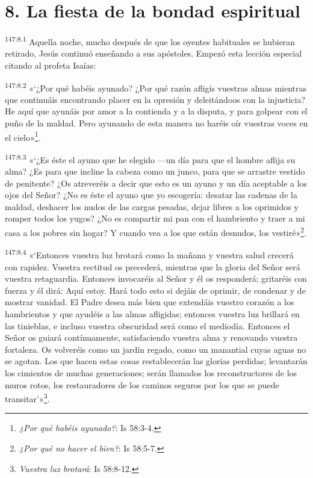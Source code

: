 \section*{8. La fiesta de la bondad espiritual}
\par
\textsuperscript{147:8.1} Aquella noche, mucho después de que los oyentes habituales se hubieran retirado, Jesús continuó enseñando a sus apóstoles. Empezó esta lección especial citando al profeta Isaías:

\par
\textsuperscript{147:8.2} «`¿Por qué habéis ayunado? ¿Por qué razón afligís vuestras almas mientras que continuáis encontrando placer en la opresión y deleitándoos con la injusticia? He aquí que ayunáis por amor a la contienda y a la disputa, y para golpear con el puño de la maldad. Pero ayunando de esta manera no haréis oír vuestras voces en el cielo»\footnote{\textit{¿Por qué habéis ayunado?}: Is 58:3-4.}.

\par
\textsuperscript{147:8.3} «`¿Es éste el ayuno que he elegido ---un día para que el hombre aflija su alma? ¿Es para que incline la cabeza como un junco, para que se arrastre vestido de penitente? ¿Os atreveréis a decir que esto es un ayuno y un día aceptable a los ojos del Señor? ¿No es éste el ayuno que yo escogería: desatar las cadenas de la maldad, deshacer los nudos de las cargas pesadas, dejar libres a los oprimidos y romper todos los yugos? ¿No es compartir mi pan con el hambriento y traer a mi casa a los pobres sin hogar? Y cuando vea a los que están desnudos, los vestiré»\footnote{\textit{¿Por qué no hacer el bien?}: Is 58:5-7.}.

\par
\textsuperscript{147:8.4} «`Entonces vuestra luz brotará como la mañana y vuestra salud crecerá con rapidez. Vuestra rectitud os precederá, mientras que la gloria del Señor será vuestra retaguardia. Entonces invocaréis al Señor y él os responderá; gritaréis con fuerza y él dirá: Aquí estoy. Hará todo esto si dejáis de oprimir, de condenar y de mostrar vanidad. El Padre desea más bien que extendáis vuestro corazón a los hambrientos y que ayudéis a las almas afligidas; entonces vuestra luz brillará en las tinieblas, e incluso vuestra obscuridad será como el mediodía. Entonces el Señor os guiará contínuamente, satisfaciendo vuestra alma y renovando vuestra fortaleza. Os volveréis como un jardín regado, como un manantial cuyas aguas no se agotan. Los que hacen estas cosas restablecerán las glorias perdidas; levantarán los cimientos de muchas generaciones; serán llamados los reconstructores de los muros rotos, los restauradores de los caminos seguros por los que se puede transitar'»\footnote{\textit{Vuestra luz brotará}: Is 58:8-12.}.

